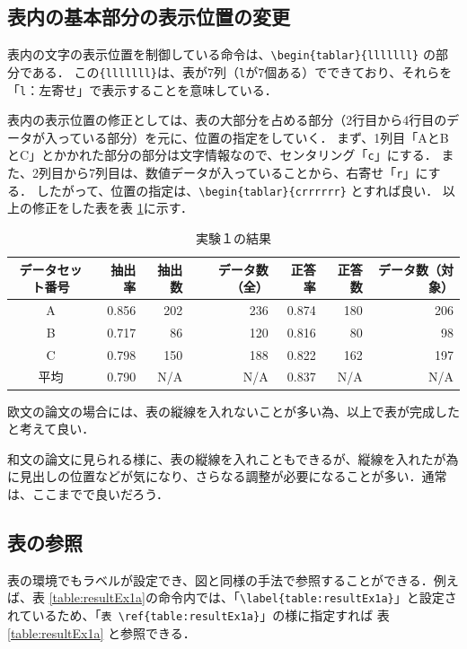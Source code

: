 \subsection{表内の基本部分の表示位置の変更}
表内の文字の表示位置を制御している命令は、\verb+\begin{tablar}{lllllll}+
の部分である．
この\verb+{lllllll}+は、表が7列（\verb+l+が7個ある）でできており、それらを「\verb+l+：左寄せ」で表示することを意味している．

表内の表示位置の修正としては、表の大部分を占める部分（2行目から4行目のデータが入っている部分）を元に、位置の指定をしていく．
まず、1列目「AとBとC」とかかれた部分の部分は文字情報なので、センタリング「\verb+c+」にする．
また、2列目から7列目は、数値データが入っていることから、右寄せ「\verb+r+」にする．
したがって、位置の指定は、\verb+\begin{tablar}{crrrrrr}+ とすれば良い．
以上の修正をした表を表 \ref{table:resultEx1c}に示す．
\begin{table}[H]
\caption{実験１の結果}
\centering
\begin{tabular}{crrrrrr}
\hline
データセット番号 & 抽出率 & 抽出数 & データ数（全） & 正答率 & 正答数 & データ数（対象）\\ \hline \hline
A & 0.856 & 202 & 236 & 0.874 & 180 & 206\\ \hline
B & 0.717 & 86 & 120 & 0.816 & 80 & 98\\ \hline
C & 0.798 & 150 & 188 & 0.822 & 162 & 197\\ \hline \hline
平均 & 0.790 & N/A & N/A & 0.837 & N/A & N/A\\ \hline
\end{tabular}
\label{table:resultEx1c}
\end{table}

欧文の論文の場合には、表の縦線を入れないことが多い為、以上で表が完成したと考えて良い．

和文の論文に見られる様に、表の縦線を入れこともできるが、縦線を入れたが為に見出しの位置などが気になり、さらなる調整が必要になることが多い．通常は、ここまでで良いだろう．

\subsection{表の参照}
表の環境でもラベルが設定でき、図と同様の手法で参照することができる．例えば、表 \ref{table:resultEx1a}の命令内では、「\verb+\label{table:resultEx1a}+」と設定されているため、「\verb+表 \ref{table:resultEx1a}+」の様に指定すれば 表 \ref{table:resultEx1a} と参照できる．

